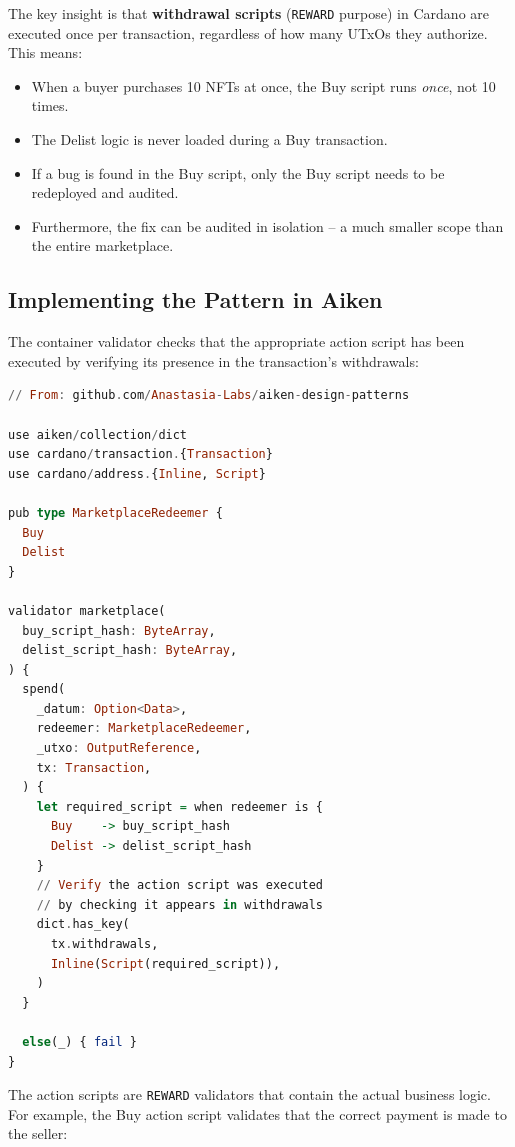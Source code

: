 The key insight is that \textbf{withdrawal scripts} (\texttt{REWARD} purpose) in Cardano are executed once per transaction, regardless of how many UTxOs they authorize. This means:

\begin{itemize}
    \item When a buyer purchases 10 NFTs at once, the Buy script runs \textit{once}, not 10 times.
    \item The Delist logic is never loaded during a Buy transaction.
    \item If a bug is found in the Buy script, only the Buy script needs to be redeployed and audited.
    \item Furthermore, the fix can be audited in isolation -- a much smaller scope than the entire marketplace.
\end{itemize}

\subsection{Implementing the Pattern in Aiken}

The container validator checks that the appropriate action script has been executed by verifying its presence in the transaction's withdrawals:

\begin{lstlisting}[language=haskell, caption=Container Validator (Spend) in Aiken]
// From: github.com/Anastasia-Labs/aiken-design-patterns

use aiken/collection/dict
use cardano/transaction.{Transaction}
use cardano/address.{Inline, Script}

pub type MarketplaceRedeemer {
  Buy
  Delist
}

validator marketplace(
  buy_script_hash: ByteArray,
  delist_script_hash: ByteArray,
) {
  spend(
    _datum: Option<Data>,
    redeemer: MarketplaceRedeemer,
    _utxo: OutputReference,
    tx: Transaction,
  ) {
    let required_script = when redeemer is {
      Buy    -> buy_script_hash
      Delist -> delist_script_hash
    }
    // Verify the action script was executed
    // by checking it appears in withdrawals
    dict.has_key(
      tx.withdrawals,
      Inline(Script(required_script)),
    )
  }

  else(_) { fail }
}
\end{lstlisting}

The action scripts are \texttt{REWARD} validators that contain the actual business logic. For example, the Buy action script validates that the correct payment is made to the seller:

